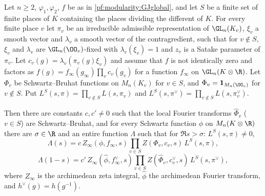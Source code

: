 \begin{theorem}\label{pf:modularity:genFE}
Let $n\ge2$, $\varphi_1,\varphi_2$, $f$ be as in \cref{pf:modularity:GJglobal}, and let $S$ be a finite set of finite
places of $K$ containing the places dividing the different of $K$. For every finite place $v$ let $\pi_v$ be an
irreducible admissible representation of $\GL_n(K_v)$, $\xi_v$ a smooth vector and $\lambda_v$ a smooth vector of the
contragredient, such that for $v\notin S$, $\xi_v$ and $\lambda_v$ are $\GL_n(\OO_v)$-fixed with $\lambda_v(\xi_v)=1$
and $z_v$ is a Satake parameter of $\pi_v$. Let $c_v(g)=\lambda_v(\pi_v(g)\xi_v)$ and assume that $f$ is not identically
zero and factors as $f(g)=f_\infty(g_\infty)\prod_vc_v(g_v)$ for a function $f_\infty$ on $\GL_n(K\otimes\R)$. Let
$\Phi_v$ be Schwartz--Bruhat functions on $M_n(K_v)$ for $v\in S$, and $\Phi_v=\mathbf 1_{M_n(\OO_v)}$ for $v\notin S$.
Put $L^S(s,\pi)=\prod_{v\notin S}L(s,\pi_v)$ and $L^S(s,\pi^\vee)=\prod_{v\notin S}L(s,\pi_v^\vee)$.

Then there are constants $c,c'\ne0$ such that the local Fourier transforms $\widehat\Phi_v$ ($v\in S$) are
Schwartz--Bruhat, and for every Schwartz function $\phi$ on $M_n(K\otimes\R)$ there are $\sigma\in\R$ and an entire
function $\Lambda$ such that for $\Re s>\sigma$: $L^S(s,\pi)\ne0$,
\[
 \Lambda(s)=c\,Z_\infty(\phi,f_\infty,s)\prod_{v\in S}Z(\Phi_v,c_v,s)\,L^S(s,\pi),
\]
\[
 \Lambda(1-s)=c'\,Z_\infty(\widehat\phi,f_\infty^\vee,s)\prod_{v\in S}Z(\widehat\Phi_v,c_v^\vee,s)\,L^S(s,\pi^\vee),
\]
where $Z_\infty$ is the archimedean zeta integral, $\widehat\phi$ the archimedean Fourier transform, and
$h^\vee(g)=h(g^{-1})$.
\end{theorem}

